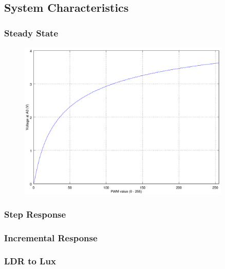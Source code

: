 \subsection{System Characteristics}
\label{sec:SystemCharacteristics}

\subsubsection{Steady State}
\label{sub:SteadyState}

\begin{figure}[h]
	\centering
	\includegraphics[width=0.9\textwidth]{img/steady_state}
	\caption{}
	\label{fig:}
\end{figure}

\subsubsection{Step Response}
\label{sub:StepResponse}

\subsubsection{Incremental Response}
\label{sub:IncrementalResponse}

\subsubsection{LDR to Lux}
\label{sub:LDRtoLux}
